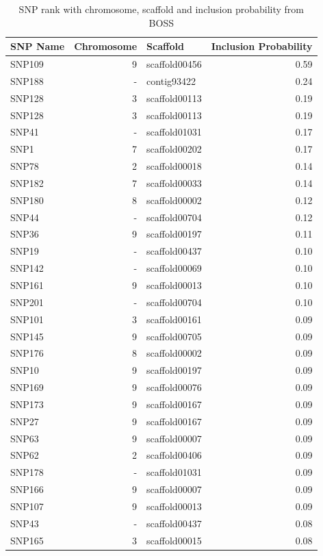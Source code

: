 \begin{longtable}{lrlr}
\caption{SNP rank with chromosome, scaffold and inclusion probability from BOSS\label{tab:rank}}
\\
\hline 
 SNP Name & Chromosome & Scaffold & Inclusion Probability \\ 
  \hline
SNP109 &   9 & scaffold00456 & 0.59 \\ 
  SNP188 & - & contig93422 & 0.24 \\ 
  SNP128 &   3 & scaffold00113 & 0.19 \\ 
  SNP128 &   3 & scaffold00113 & 0.19 \\ 
  SNP41 & - & scaffold01031 & 0.17 \\ 
  SNP1 &   7 & scaffold00202 & 0.17 \\ 
  SNP78 &   2 & scaffold00018 & 0.14 \\ 
  SNP182 &   7 & scaffold00033 & 0.14 \\ 
  SNP180 &   8 & scaffold00002 & 0.12 \\ 
  SNP44 & - & scaffold00704 & 0.12 \\ 
  SNP36 &   9 & scaffold00197 & 0.11 \\ 
  SNP19 & - & scaffold00437 & 0.10 \\ 
  SNP142 & - & scaffold00069 & 0.10 \\ 
  SNP161 &   9 & scaffold00013 & 0.10 \\ 
  SNP201 & - & scaffold00704 & 0.10 \\ 
  SNP101 &   3 & scaffold00161 & 0.09 \\ 
  SNP145 &   9 & scaffold00705 & 0.09 \\ 
  SNP176 &   8 & scaffold00002 & 0.09 \\ 
  SNP10 &   9 & scaffold00197 & 0.09 \\ 
  SNP169 &   9 & scaffold00076 & 0.09 \\ 
  SNP173 &   9 & scaffold00167 & 0.09 \\ 
  SNP27 &   9 & scaffold00167 & 0.09 \\ 
  SNP63 &   9 & scaffold00007 & 0.09 \\ 
  SNP62 &   2 & scaffold00406 & 0.09 \\ 
  SNP178 & - & scaffold01031 & 0.09 \\ 
  SNP166 &   9 & scaffold00007 & 0.09 \\ 
  SNP107 &   9 & scaffold00013 & 0.09 \\ 
  SNP43 & - & scaffold00437 & 0.08 \\ 
  SNP165 &   3 & scaffold00015 & 0.08 \\ 

\end{longtable}
